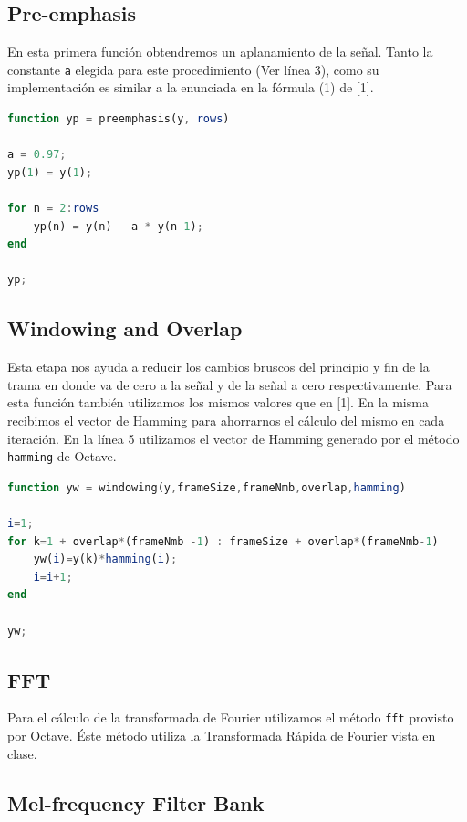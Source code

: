 \documentclass[a4paper,10pt]{article}
\begin{document}
\subsection{Pre-emphasis}

En esta primera función obtendremos un aplanamiento de la señal. Tanto la constante \texttt{a} elegida para este procedimiento (Ver línea 3), como su implementación es similar a la enunciada en la fórmula (1) de [1].
\newline
\begin{lstlisting}[language=Octave, caption = Pre-emphasis]
function yp = preemphasis(y, rows)

a = 0.97;
yp(1) = y(1);

for n = 2:rows
	yp(n) = y(n) - a * y(n-1);
end

yp;
\end{lstlisting}

\subsection{Windowing and Overlap}
Esta etapa nos ayuda a reducir los cambios bruscos del principio y fin de la trama en donde va de cero a la señal y de la señal a cero respectivamente.
Para esta función también utilizamos los mismos valores que en [1]. En la misma recibimos el vector de Hamming para ahorrarnos el cálculo del mismo en cada iteración. En la línea 5 utilizamos el vector de Hamming generado por el método \texttt{hamming} de Octave.
\newline
\begin{lstlisting}[language=Octave, caption = Windowing]
function yw = windowing(y,frameSize,frameNmb,overlap,hamming)

i=1;
for k=1 + overlap*(frameNmb -1) : frameSize + overlap*(frameNmb-1)
	yw(i)=y(k)*hamming(i);
	i=i+1;
end

yw;
\end{lstlisting}

\subsection{FFT}

Para el cálculo de la transformada de Fourier utilizamos el método \texttt{fft} provisto por Octave. Éste método utiliza la Transformada Rápida de Fourier vista en clase.

\subsection{Mel-frequency Filter Bank}
\end{document}
